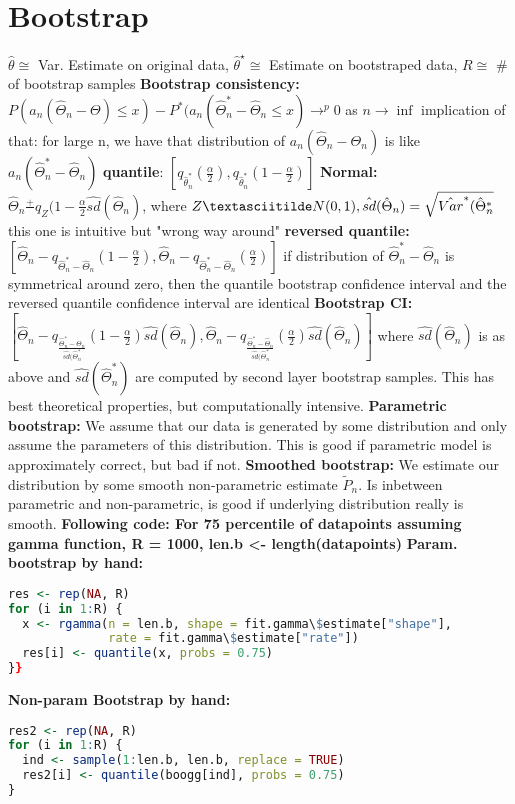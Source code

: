 \section{Bootstrap}
$\hat{\theta} \cong$ Var. Estimate on original data, $\hat{\theta}^\star \cong$ Estimate on bootstraped data, $R \cong$ \# of bootstrap samples
\textbf{Bootstrap consistency: }$P(a_n(\hat\Theta_n-\Theta) \leq x)-P^*(a_n(\hat\Theta_n^*-\hat\Theta_n \leq x) \rightarrow^p 0$ as $n \rightarrow \inf$ implication of that: for large n, we have that distribution of $a_n(\hat\Theta_n - \Theta_n)$ is like $a_n(\hat\Theta^*_n- \hat\Theta_n)$
\textbf{quantile}: $[q_{\hat\theta_n^*}(\frac{\alpha}{2}),q_{\hat\theta_n^*}(1-\frac{\alpha}{2})]$
\textbf{Normal: }$\hat\Theta_n \frac{+}{} q_Z(1-\frac{\alpha}{2}\hat{sd}(\hat\Theta_n)$, where $Z \textasciitilde N(0,1), \hat{sd}(\hat \Theta_n) = \sqrt{\hat{Var}^*(\hat{\Theta}_n^*}$ this one is intuitive but "wrong way around"
\textbf{reversed quantile: } $[\hat\Theta_n - q_{\hat\Theta_n^*-\hat\Theta_n}(1-\frac{\alpha}{2}), \hat\Theta_n - q_{\hat\Theta_n^*-\hat\Theta_n}(\frac{\alpha}{2})]$  if distribution of $\hat \Theta_n^*- \hat \Theta_n$ is symmetrical around zero, then the quantile bootstrap confidence interval and the reversed quantile confidence interval are identical 
\textbf{Bootstrap CI: }$[\hat\Theta_n - q_{\frac{\hat\Theta_n^*-\hat\Theta_n}{\hat{sd}(\hat\Theta_n^*}}(1-\frac{\alpha}{2})\hat{sd}(\hat\Theta_n), \hat\Theta_n - q_{\frac{\hat\Theta_n^*-\hat\Theta_n}{\hat{sd}(\hat\Theta_n^*}}(\frac{\alpha}{2})\hat{sd}(\hat\Theta_n)]$ where $\hat{sd}(\hat\Theta_n)$ is as above and $\hat{sd}(\hat\Theta_n^*)$ are computed by second layer bootstrap samples. This has best theoretical properties, but computationally intensive. 
\textbf{Parametric bootstrap: } We assume that our data is generated by some distribution and only assume the parameters of this distribution. This is good if parametric model is approximately correct, but bad if not. 
\textbf{Smoothed bootstrap: } We estimate our distribution by some smooth non-parametric estimate $\tilde P_n$. Is inbetween parametric and non-parametric, is good if underlying distribution really is smooth. 
\textbf{Following code: For 75 percentile of datapoints assuming gamma function, R = 1000, len.b <- length(datapoints)}
\textbf{Param. bootstrap by hand:}
\begin{lstlisting}[language=R]
res <- rep(NA, R)
for (i in 1:R) {
  x <- rgamma(n = len.b, shape = fit.gamma\$estimate["shape"],
              rate = fit.gamma\$estimate["rate"])
  res[i] <- quantile(x, probs = 0.75)
}}
\end{lstlisting}
\textbf{Non-param Bootstrap by hand:}
\begin{lstlisting}[language=R]
res2 <- rep(NA, R)
for (i in 1:R) {
  ind <- sample(1:len.b, len.b, replace = TRUE)
  res2[i] <- quantile(boogg[ind], probs = 0.75)
}
\end{lstlisting}

